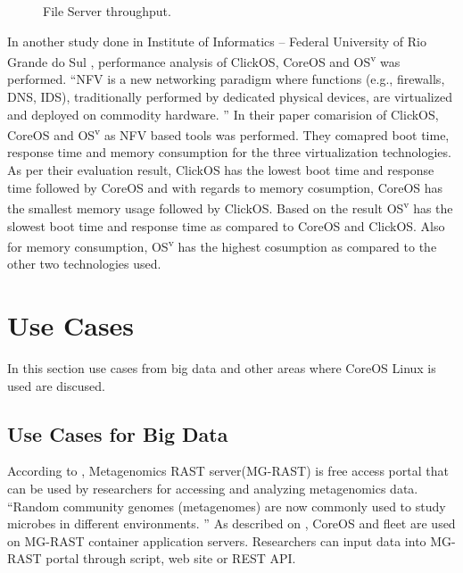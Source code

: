 \documentclass[9pt,twocolumn,twoside]{styles/osajnl}
\begin{document}
\begin{figure}[htbp]
\centering
{}
\caption{File Server throughput. \cite{julian2016containers} }
\label{fig:false-color}
\end{figure}

In another study done in Institute of Informatics – Federal University
of Rio Grande do Sul \cite{2016NFVSolutions}, performance analysis of
ClickOS, CoreOS and OS\textsuperscript{v} was performed. “NFV is a new
networking paradigm where functions (e.g., firewalls, DNS, IDS),
traditionally performed by dedicated physical devices, are virtualized
and deployed on commodity hardware. ” In their paper comarision of
ClickOS, CoreOS and OS\textsuperscript{v} as NFV based tools was
performed. They comapred boot time, response time and memory
consumption for the three virtualization technologies. As per their
evaluation result, ClickOS has the lowest boot time and response time
followed by CoreOS and with regards to memory cosumption, CoreOS has
the smallest memory usage followed by ClickOS. Based on the result
OS\textsuperscript{v} has the slowest boot time and response time as
compared to CoreOS and ClickOS. Also for memory consumption,
OS\textsuperscript{v} has the highest cosumption as compared to the
other two technologies used.

\section{Use Cases}

In this section use cases from big data and other areas where CoreOS
Linux is used are discused.

\subsection{Use Cases  for Big Data}

According to \cite{meyer2008metagenomics} , Metagenomics RAST
server(MG-RAST) is free access portal that can be used by researchers
for accessing and analyzing metagenomics data. “Random community
genomes (metagenomes) are now commonly used to study microbes in
different environments. ” As described on \cite{wilke2016mg}, CoreOS and
fleet are used on MG-RAST container application servers. Researchers
can input data into MG-RAST portal through script, web site or REST
API.
\end{document}
